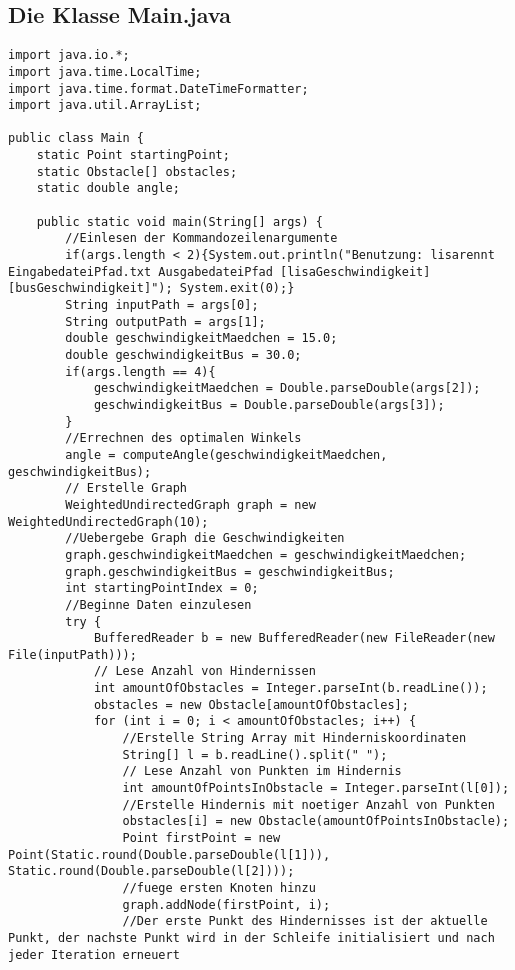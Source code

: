 \documentclass[a4paper,10pt,ngerman]{scrartcl}
\begin{document}
\subsection{Die Klasse Main.java}
\begin{lstlisting}[frame=single]import java.io.*;
import java.time.LocalTime;
import java.time.format.DateTimeFormatter;
import java.util.ArrayList;

public class Main {
    static Point startingPoint;
    static Obstacle[] obstacles;
    static double angle;

    public static void main(String[] args) {
        //Einlesen der Kommandozeilenargumente
        if(args.length < 2){System.out.println("Benutzung: lisarennt EingabedateiPfad.txt AusgabedateiPfad [lisaGeschwindigkeit] [busGeschwindigkeit]"); System.exit(0);}
        String inputPath = args[0];
        String outputPath = args[1];
        double geschwindigkeitMaedchen = 15.0;
        double geschwindigkeitBus = 30.0;
        if(args.length == 4){
            geschwindigkeitMaedchen = Double.parseDouble(args[2]);
            geschwindigkeitBus = Double.parseDouble(args[3]);
        }
        //Errechnen des optimalen Winkels
        angle = computeAngle(geschwindigkeitMaedchen, geschwindigkeitBus);
        // Erstelle Graph
        WeightedUndirectedGraph graph = new WeightedUndirectedGraph(10);
        //Uebergebe Graph die Geschwindigkeiten
        graph.geschwindigkeitMaedchen = geschwindigkeitMaedchen;
        graph.geschwindigkeitBus = geschwindigkeitBus;
        int startingPointIndex = 0;
        //Beginne Daten einzulesen
        try {
            BufferedReader b = new BufferedReader(new FileReader(new File(inputPath)));
            // Lese Anzahl von Hindernissen
            int amountOfObstacles = Integer.parseInt(b.readLine());
            obstacles = new Obstacle[amountOfObstacles];
            for (int i = 0; i < amountOfObstacles; i++) {
                //Erstelle String Array mit Hinderniskoordinaten
                String[] l = b.readLine().split(" ");
                // Lese Anzahl von Punkten im Hindernis
                int amountOfPointsInObstacle = Integer.parseInt(l[0]);
                //Erstelle Hindernis mit noetiger Anzahl von Punkten
                obstacles[i] = new Obstacle(amountOfPointsInObstacle);
                Point firstPoint = new Point(Static.round(Double.parseDouble(l[1])), Static.round(Double.parseDouble(l[2])));
                //fuege ersten Knoten hinzu
                graph.addNode(firstPoint, i);
                //Der erste Punkt des Hindernisses ist der aktuelle Punkt, der nachste Punkt wird in der Schleife initialisiert und nach jeder Iteration erneuert

\end{lstlisting}
\end{document}
